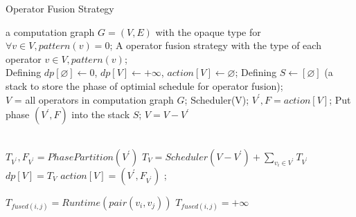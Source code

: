 \begin{algorithm}[htb]
    \caption{Operator Fusion Strategy}
    \begin{algorithmic}[1]
        \Require
        a computation graph $G=(V, E)$ with the opaque type for ${\forall v \in V}, pattern(v) = 0$;
      \Ensure
        A operator fusion strategy with the type of each operator $v \in V, pattern(v)$;
        \\
        \State Defining $dp[\varnothing] \gets 0$, $dp[V] \gets +\infty$, $action[V] \gets \varnothing$;
        \State Defining $S \gets \left[\varnothing\right]$ (a stack to store the phase of optimial schedule for operator fusion);
    \\
        \State $V$ = all operators in computation graph $G$;
        \State Scheduler(V);
            \State $V^{'}, F = action[V]$;
            \State Put phase $(V^{'}, F)$ into the stack $S$;
            \State $V = V - V^{'}$
        \EndWhile
        \State {}

    \EndFunction
    \\
            \State {}
        \EndIf
            \State $T_{V^{'}}, F_{V^{'}} = PhasePartition(V^{'})$
            \State $T_{V} = Scheduler(V-V^{'}) + \sum_{v_i \in V^{'}}T_{V^{'}}$
                \State $dp[V] = T_{V}$
                \State $action[V] = (V^{'}, F_{V^{'}})$
            \EndIf
        \EndFor;
        \State {}
    \EndFunction
    \\

                \State $T_{fused(i, j)} = Runtime(pair(v_i, v_j))$
            \Else
                \State $T_{fused(i, j)} = +\infty$
            \EndIf
        \EndFor
        \State {}        


\end{algorithmic}
\end{algorithm}
